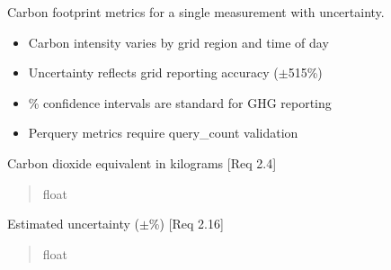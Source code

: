 \documentclass[letterpaper,10pt,english]{sphinxmanual}
\begin{document}
\begin{fulllineitems}
\sphinxAtStartPar
Carbon footprint metrics for a single measurement with uncertainty.
\begin{description}
\begin{itemize}
\item {} 
\sphinxAtStartPar
Carbon intensity varies by grid region and time of day

\item {} 
\sphinxAtStartPar
Uncertainty reflects grid reporting accuracy (\(\pm\)5\sphinxhyphen{}15\%)

\item {} 
\% confidence intervals are standard for GHG reporting

\item {} 
\sphinxAtStartPar
Per\sphinxhyphen{}query metrics require query\_count validation

\end{itemize}

\end{description}

\begin{fulllineitems}
\label{\detokenize{core.sustainability.models.carbon_metrics:core.sustainability.models.carbon_metrics.CarbonMetrics.kg}}
\pysigstartsignatures
\pysigline
{}
\pysigstopsignatures
\sphinxAtStartPar
Carbon dioxide equivalent in kilograms {[}Req 2.4{]}
\begin{quote}\begin{description}
\sphinxAtStartPar
float

\end{description}\end{quote}

\end{fulllineitems}


\begin{fulllineitems}
\label{\detokenize{core.sustainability.models.carbon_metrics:core.sustainability.models.carbon_metrics.CarbonMetrics.uncertainty_percent}}
\pysigstartsignatures
\pysigline
{}
\pysigstopsignatures
\sphinxAtStartPar
Estimated uncertainty (\(\pm\)\%) {[}Req 2.16{]}
\begin{quote}\begin{description}
\sphinxAtStartPar
float


\end{description}
\end{quote}
\end{fulllineitems}
\end{fulllineitems}
\end{document}
